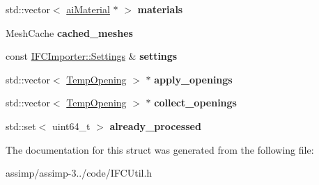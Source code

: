 \begin{DoxyCompactItemize}
\item 
\hypertarget{struct_assimp_1_1_i_f_c_1_1_conversion_data_ab909420ff50f1b36109210bfe9fd2df7}{std\+::vector$<$ \hyperlink{classai_material}{ai\+Material} $\ast$ $>$ {\bfseries materials}}\label{struct_assimp_1_1_i_f_c_1_1_conversion_data_ab909420ff50f1b36109210bfe9fd2df7}

\item 
\hypertarget{struct_assimp_1_1_i_f_c_1_1_conversion_data_aacc90f1bcede68f088298b973afae16b}{Mesh\+Cache {\bfseries cached\+\_\+meshes}}\label{struct_assimp_1_1_i_f_c_1_1_conversion_data_aacc90f1bcede68f088298b973afae16b}

\item 
\hypertarget{struct_assimp_1_1_i_f_c_1_1_conversion_data_a49ed062e7c698244440b67af8d833113}{const \hyperlink{struct_assimp_1_1_i_f_c_importer_1_1_settings}{I\+F\+C\+Importer\+::\+Settings} \& {\bfseries settings}}\label{struct_assimp_1_1_i_f_c_1_1_conversion_data_a49ed062e7c698244440b67af8d833113}

\item 
\hypertarget{struct_assimp_1_1_i_f_c_1_1_conversion_data_ae0857091adff2b1c716d6e602baabfbd}{std\+::vector$<$ \hyperlink{struct_assimp_1_1_i_f_c_1_1_temp_opening}{Temp\+Opening} $>$ $\ast$ {\bfseries apply\+\_\+openings}}\label{struct_assimp_1_1_i_f_c_1_1_conversion_data_ae0857091adff2b1c716d6e602baabfbd}

\item 
\hypertarget{struct_assimp_1_1_i_f_c_1_1_conversion_data_ab3c865527307269f74daabf3306e3cde}{std\+::vector$<$ \hyperlink{struct_assimp_1_1_i_f_c_1_1_temp_opening}{Temp\+Opening} $>$ $\ast$ {\bfseries collect\+\_\+openings}}\label{struct_assimp_1_1_i_f_c_1_1_conversion_data_ab3c865527307269f74daabf3306e3cde}

\item 
\hypertarget{struct_assimp_1_1_i_f_c_1_1_conversion_data_a029928625d0d9c0764b8ddfc2d88406a}{std\+::set$<$ uint64\+\_\+t $>$ {\bfseries already\+\_\+processed}}\label{struct_assimp_1_1_i_f_c_1_1_conversion_data_a029928625d0d9c0764b8ddfc2d88406a}

\end{DoxyCompactItemize}


The documentation for this struct was generated from the following file\+:\begin{DoxyCompactItemize}
\item 
assimp/assimp-\/3../code/I\+F\+C\+Util.\+h\end{DoxyCompactItemize}

